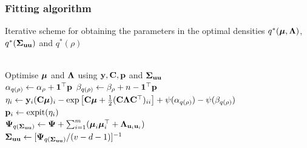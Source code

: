 \documentclass{beamer}
\begin{document}

\begin{frame}
	\frametitle{Fitting algorithm}
		
	\begin{algorithm}[H]
		\caption[Algorithm 1]{Iterative scheme for obtaining the parameters in the
			optimal densities $q^*({\boldsymbol \mu}, {\boldsymbol \Lambda})$, $q^*({\boldsymbol \Sigma}_{{\bf u} {\bf u}})$ and $q^*(\rho)$}
		\label{alg:algorithm_one}
		\begin{algorithmic}
			 \\[1ex]
			\STATE Optimise ${\boldsymbol \mu}$ and ${\boldsymbol \Lambda}$ using ${\bf y}, {\bf C}, {\bf p}$ and ${\boldsymbol \Sigma}_{{\bf u} {\bf u}}$ \\[1ex]
			\STATE $\alpha_{q(\rho)} \leftarrow \alpha_\rho + {\bf 1}^\top{\bf p}$
			\STATE $\beta_{q(\rho)} \leftarrow \beta_\rho + n - {\bf 1}^\top{\bf p}$ \\[1ex]
				\STATE $\eta_i \leftarrow {\bf y}_i ({\bf C} {\boldsymbol \mu})_i - \exp \left [ {\bf C} {\boldsymbol \mu} + \tfrac{1}{2} ({\bf C}{\boldsymbol \Lambda}{\bf C}^\top)_{ii} \right ] + \psi{(\alpha_{q{(\rho)}})} - \psi{(\beta_{q{(\rho)}})}$ \\[1ex]
				\STATE ${\bf p}_i \leftarrow \text{expit} (\eta_i)$ \\[1ex]
			\ENDFOR
			\STATE ${\boldsymbol \Psi}_{q({\boldsymbol \Sigma}_{{\bf u} {\bf u}})} \leftarrow {\boldsymbol\Psi} + \sum_{i=1}^m ({\boldsymbol \mu}_i {\boldsymbol \mu}_i^\top + {\boldsymbol \Lambda}_{{\bf u}_i {\bf u}_i})$ \\[1ex]
			\STATE ${\boldsymbol \Sigma}_{{\bf u}{\bf u}} \leftarrow [{\boldsymbol \Psi}_{q({\boldsymbol \Sigma}_{{\bf u} {\bf u}})}/(v - d - 1)]^{-1}$
			\ENDWHILE
			\end{algorithmic}
		\end{algorithm}
						
	\end{frame}
			
\end{document}
